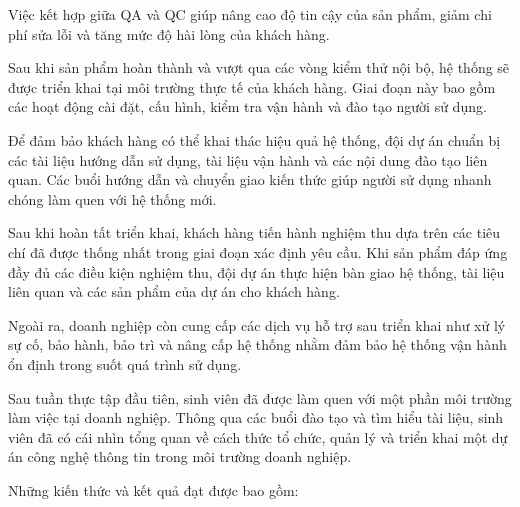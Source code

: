 \hspace{0.2cm}Việc kết hợp giữa QA và QC giúp nâng cao độ tin cậy của sản phẩm, giảm chi phí sửa lỗi và tăng mức độ hài lòng của khách hàng.



\hspace{0.2cm}Sau khi sản phẩm hoàn thành và vượt qua các vòng kiểm thử nội bộ, hệ thống sẽ được triển khai tại môi trường thực tế của khách hàng. Giai đoạn này bao gồm các hoạt động cài đặt, cấu hình, kiểm tra vận hành và đào tạo người sử dụng.

\hspace{0.2cm}Để đảm bảo khách hàng có thể khai thác hiệu quả hệ thống, đội dự án chuẩn bị các tài liệu hướng dẫn sử dụng, tài liệu vận hành và các nội dung đào tạo liên quan. Các buổi hướng dẫn và chuyển giao kiến thức giúp người sử dụng nhanh chóng làm quen với hệ thống mới.

\hspace{0.2cm}Sau khi hoàn tất triển khai, khách hàng tiến hành nghiệm thu dựa trên các tiêu chí đã được thống nhất trong giai đoạn xác định yêu cầu. Khi sản phẩm đáp ứng đầy đủ các điều kiện nghiệm thu, đội dự án thực hiện bàn giao hệ thống, tài liệu liên quan và các sản phẩm của dự án cho khách hàng.

\hspace{0.2cm}Ngoài ra, doanh nghiệp còn cung cấp các dịch vụ hỗ trợ sau triển khai như xử lý sự cố, bảo hành, bảo trì và nâng cấp hệ thống nhằm đảm bảo hệ thống vận hành ổn định trong suốt quá trình sử dụng.


Sau tuần thực tập đầu tiên, sinh viên đã được làm quen với một phần môi trường làm việc tại doanh nghiệp. Thông qua các buổi đào tạo và tìm hiểu tài liệu, sinh viên đã có cái nhìn tổng quan về cách thức tổ chức, quản lý và triển khai một dự án công nghệ thông tin trong môi trường doanh nghiệp.

Những kiến thức và kết quả đạt được bao gồm:

